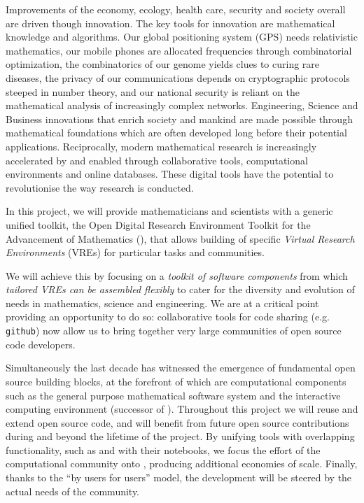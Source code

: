 Improvements of the economy, ecology, health care, security and
society overall are driven though innovation. The key tools
for innovation are mathematical knowledge and
algorithms. Our global positioning system (GPS)
needs relativistic mathematics, our mobile phones are allocated frequencies through
combinatorial optimization, the combinatorics of our genome yields clues to curing rare diseases, 
the privacy of our communications depends on cryptographic protocols steeped in number theory,  
and our national security is reliant on the mathematical analysis of increasingly complex networks. Engineering, Science and Business
innovations that enrich society and mankind are made possible through
mathematical foundations which are often developed long before their potential
applications.
%
Reciprocally, modern mathematical research is increasingly accelerated by and
enabled through collaborative tools, computational environments and
online databases. These digital tools have the potential to
revolutionise the way research is conducted.

In this project, we will provide mathematicians and scientists with a
generic unified toolkit, the Open Digital Research Environment Toolkit
for the Advancement of Mathematics (\TheProject), that allows
building of specific \emph{Virtual Research Environments} (VREs) for
particular tasks and communities.


We will achieve this by focusing on a \emph{toolkit of software
  components} from which \emph{tailored VREs can be assembled
  flexibly} to cater for the diversity and evolution of needs in
mathematics, science and engineering.  We are at a critical point providing
an opportunity to do so: collaborative tools for code sharing (e.g.
\texttt{github}) now allow us to bring together very large communities
of open source code developers. %

Simultaneously the last decade has witnessed the emergence of fundamental
open source building blocks, at the forefront of which are computational
components such as the general purpose mathematical software system \Sage
and the interactive computing environment \Jupyter (successor of \IPython).
Throughout this project we will reuse and extend open source code, and
\TheProject will benefit from future open source contributions during
and beyond the lifetime of the project. By unifying tools with
overlapping functionality, such as \Jupyter and \Sage with their notebooks, we focus the
effort of the computational community onto \TheProject, producing
additional economies of scale.
Finally, thanks to the ``by users for
users'' model, the development will be steered by the actual needs of
the community.

